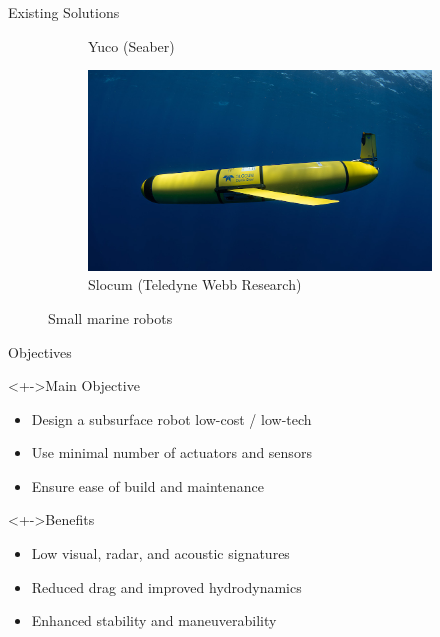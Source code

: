 \documentclass[9pt, xcolor={usenames, dvipsnames}]{beamer}
\begin{document}
\begin{frame}{Existing Solutions}
\begin{figure}
\begin{subfigure}[c]{0.4\textwidth}
                    \caption{Yuco (Seaber)}
                \end{subfigure}
                \begin{subfigure}[c]{0.4\textwidth}
                    \centering
                    \includegraphics[width=\textwidth]{imgs/slocum.jpg}
                    \caption{Slocum (Teledyne Webb Research)}
                \end{subfigure}
                \caption{Small marine robots}
            \end{figure}
        \end{frame}

        \begin{frame}{Objectives}
            \begin{block}<+->{Main Objective}
                \begin{itemize}
                    \item Design a subsurface robot low-cost / low-tech
                    \item Use minimal number of actuators and sensors
                    \item Ensure ease of build and maintenance
                \end{itemize}
            \end{block}

            \begin{block}<+->{Benefits}
                \begin{itemize}
                    \item Low visual, radar, and acoustic signatures
                    \item Reduced drag and improved hydrodynamics
                    \item Enhanced stability and maneuverability
                \end{itemize}
            \end{block}
        \end{frame}
\end{document}
